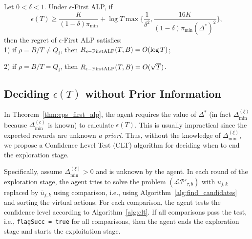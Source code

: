 \begin{theorem}\label{thm:eps_first_alp}
Let $0 < \delta < 1$. Under $\epsilon$-First ALP, if
\begin{equation}
\epsilon(T) \geq \frac{K}{(1-\delta)\pi_{\min}} + \log T \max\bigg\{\frac{1}{\delta^2}, \frac{16 K}{(1 - \delta)\pi_{\min}(\Delta^*)^2}\bigg\}, \nonumber
\end{equation}
then the regret of $\epsilon$-First ALP satisfies:\\
1) if $\rho = B/T \neq Q_i$, then $R_{\epsilon-\rm First ALP}(T,B) = O(\log T)$;

2) if $\rho = B/T = Q_i$, then $R_{\epsilon-\rm First ALP}(T,B) = O(\sqrt{T})$.
\end{theorem}


\subsection{Deciding $\epsilon(T)$ without Prior Information}
In Theorem~\ref{thm:eps_first_alp}, the agent requires the value of $\Delta^*$ (in fact $\Delta^{(\xi)}_{\min}$ because $\Delta^{(c)}_{\min}$ is known) to calculate $\epsilon(T)$. This is usually impractical since the expected rewards are unknown {\it a priori}.
Thus, without the knowledge of  $\Delta^{(\xi)}_{\min}$, we propose a Confidence Level Test (CLT) algorithm  for deciding when to end the exploration stage.

Specifically, assume $\Delta^{(\xi)}_{\min} > 0$ and is unknown by the agent. In each round of the exploration stage, the agent tries to solve the problem $({\mathcal{LP}}'_{\tau,b})$ with $u_{j,k}$ replaced by $\bar{u}_{j,k}$ using comparison, i.e., using Algorithm~\ref{alg:find_candidates} and sorting the virtual actions. For each comparison, the agent tests the confidence level according to Algorithm~\ref{alg:clt}. If all comparisons pass the test, i.e., \texttt{flagSucc = true} for all comparisons, then the agent ends the exploration stage and starts the exploitation stage.

